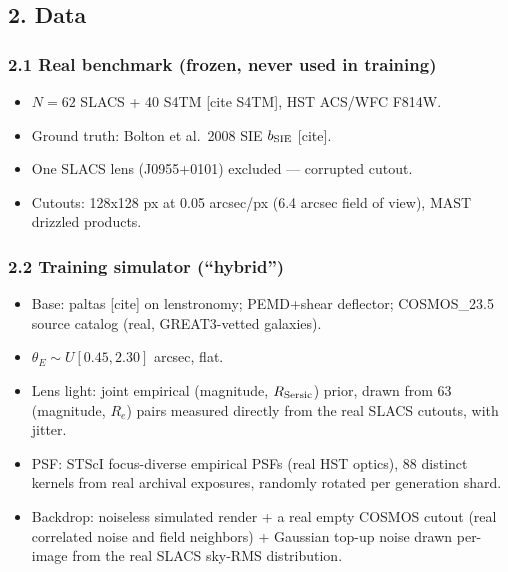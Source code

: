 \documentclass[
  11pt,
]{article}
\providecommand{\tightlist}{%
  \setlength{\itemsep}{0pt}\setlength{\parskip}{0pt}}
\begin{document}
\hypertarget{data}{%
\subsection{2. Data}\label{data}}

\hypertarget{real-benchmark-frozen-never-used-in-training}{%
\subsubsection{2.1 Real benchmark (frozen, never used in
training)}\label{real-benchmark-frozen-never-used-in-training}}

\begin{itemize}
\tightlist
\item
  \(N = 62\) SLACS + 40 S4TM {[}cite S4TM{]}, HST ACS/WFC F814W.
\item
  Ground truth: Bolton et al.~2008 SIE \(b_{\rm SIE}\) {[}cite{]}.
\item
  One SLACS lens (J0955+0101) excluded --- corrupted cutout.
\item
  Cutouts: 128x128 px at 0.05 arcsec/px (6.4 arcsec field of view), MAST
  drizzled products.
\end{itemize}

\hypertarget{training-simulator-hybrid}{%
\subsubsection{2.2 Training simulator
(``hybrid'')}\label{training-simulator-hybrid}}

\begin{itemize}
\tightlist
\item
  Base: paltas {[}cite{]} on lenstronomy; PEMD+shear deflector;
  COSMOS\_23.5 source catalog (real, GREAT3-vetted galaxies).
\item
  \(\theta_E \sim U[0.45, 2.30]\) arcsec, flat.
\item
  Lens light: joint empirical (magnitude, \(R_{\rm Sersic}\)) prior,
  drawn from 63 (magnitude, \(R_e\)) pairs measured directly from the
  real SLACS cutouts, with jitter.
\item
  PSF: STScI focus-diverse empirical PSFs (real HST optics), 88 distinct
  kernels from real archival exposures, randomly rotated per generation
  shard.
\item
  Backdrop: noiseless simulated render + a real empty COSMOS cutout
  (real correlated noise and field neighbors) + Gaussian top-up noise
  drawn per-image from the real SLACS sky-RMS distribution.
\end{itemize}
\end{document}
